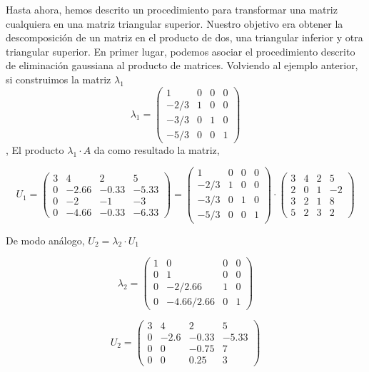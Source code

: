 Hasta ahora, hemos descrito un procedimiento para transformar una matriz cualquiera en una matriz triangular superior. Nuestro objetivo era obtener la descomposición de un matriz en el producto de dos,  una triangular inferior y otra triangular superior.  En primer lugar, podemos asociar    el procedimiento descrito de eliminación gaussiana al producto de matrices. Volviendo al ejemplo anterior, si construimos la matriz $\lambda_1$
\begin{equation*}
\lambda_1=\begin{pmatrix} 
1& 0& 0& 0\\
-2/3& 1& 0& 0\\
-3/3& 0& 1& 0\\
-5/3& 0& 0& 1
\end{pmatrix}
\end{equation*},
El producto $\lambda_1 \cdot A$ da como resultado la matriz,

\begin{equation*} 
 U_1=\begin{pmatrix}
3& 4& 2&5\\
0& -2.66& -0.33& -5.33\\
0& -2& -1& -3\\
0& -4.66& -0.33& -6.33
\end{pmatrix}=\begin{pmatrix} 
1& 0& 0& 0\\
-2/3& 1& 0& 0\\
-3/3& 0& 1& 0\\
-5/3& 0& 0& 1
\end{pmatrix}\cdot \begin{pmatrix}
3& 4& 2&5\\
2& 0& 1& -2\\
3& 2& 1& 8\\
5& 2& 3& 2
\end{pmatrix}
\end{equation*}

De modo análogo, $U_2=\lambda_2 \cdot U_1$
 
\begin{equation*}
\lambda_2=\begin{pmatrix} 
1& 0& 0& 0\\
0& 1& 0& 0\\
0& -2/2.66& 1& 0\\
0& -4.66/2.66& 0& 1
\end{pmatrix}
\end{equation*}

\begin{equation*}
U_2= \begin{pmatrix}
3& 4& 2&5\\
0& -2.6& -0.33& -5.33\\
0& 0& -0.75& 7\\
0& 0& 0.25& 3
\end{pmatrix}
\end{equation*}

